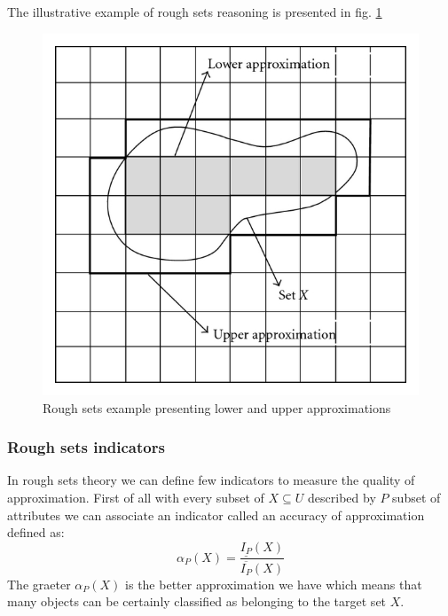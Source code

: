 The illustrative example of rough sets reasoning is presented in fig. \ref{fig:rough_set_example}
\begin{figure}[H] 
    \begin{center}
        \includegraphics{fig/rough_set.png}
    \end{center}
    \caption{Rough sets example presenting lower and upper approximations}
    \label{fig:rough_set_example}
\end{figure}

\subsubsection{Rough sets indicators}
\label{cha:Rough_sets_indicators}
In rough sets theory we can define few indicators to measure the quality of
approximation. First of all with every 
subset of $X \subseteq U$ described by $P$ subset of attributes we can 
associate an indicator called an accuracy of approximation defined as:
\begin{equation}
    \alpha_P(X)=\frac{\underline{I_P}(X)}{\overline{I_P}(X)}
    \label{eq:accuracy_approximation}
\end{equation}
The graeter $\alpha_P(X)$ is the better approximation we have which means that
many objects can be certainly classified as belonging to the target set $X$.


